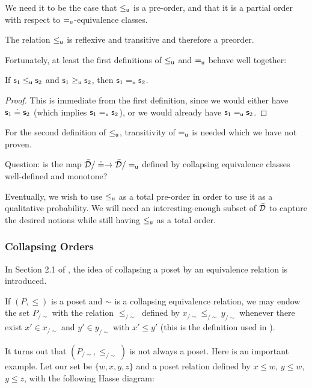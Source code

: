 \documentclass[10pt, onecolumn, longbibliography, nofootinbib]{revtex4-2}
\begin{document}
We need it to be the case that $\leq_{\mathsf{u}}$ is a pre-order, and that it is a partial order with respect to $=_{\mathsf{u}}$-equivalence classes. 

\begin{desid}
	The relation $\leq_{\mathsf{u}}$ is reflexive and transitive and therefore a preorder. 
\end{desid}

Fortunately, at least the first definitions of $\leq_{\mathsf{u}}$ and $=_{\mathsf{u}}$ behave well together:

\begin{prop}
	If $\mathsf{s}_1\leq_{\mathsf{u}}\mathsf{s}_2$ and $\mathsf{s}_1\geq_{\mathsf{u}} \mathsf{s}_2$, then $\mathsf{s}_1=_{\mathsf{u}}\mathsf{s}_2$.
\end{prop}
\begin{proof}
	This is immediate from the first definition, since we would either have $\mathsf{s}_1\doteq\mathsf{s}_2$ (which implies $\mathsf{s}_1=_{\mathsf{u}}\mathsf{s}_2$), or we would already have $\mathsf{s}_1=_{\mathsf{u}}\mathsf{s}_2$.
\end{proof}

For the second definition of $\leq_{\mathsf{u}}$, transitivity of $=_{\mathsf{u}}$ is needed which we have not proven. 

Question: is the map $\bar{\mathcal{D}} / \doteq \to \bar{\mathcal{D}} / =_{\mathsf{u}}$ defined by collapsing equivalence classes well-defined and monotone? 

Eventually, we wish to use $\leq_{\mathsf{u}}$ as a total pre-order in order to use it as a qualitative probability. We will need an interesting-enough subset of $\bar{\mathcal{D}}$ to capture the desired notions while still having $\leq_{\mathsf{u}}$ as a total order.

\subsubsection{Collapsing Orders}
In Section 2.1 of \cite{quotientposets}, the idea of collapsing a poset by an equivalence relation is introduced. 

If $(P,\leq)$ is a poset and $\sim$ is a collapsing equivalence relation, we may endow the set $P_{/\sim}$ with the relation $\leq_{/\sim}$ defined by $x_{/\sim} \leq_{/\sim} y_{/\sim}$ whenever there exist $x'\in x_{/\sim}$ and $y'\in y_{/\sim}$ with $x'\leq y'$ (this is the definition used in \cite{quotientposets}). 

It turns out that $(P_{/\sim},\leq_{/\sim})$ is not always a poset. Here is an important example. Let our set be $\{w,x,y,z\}$ and a poset relation defined by $x\leq w$, $y\leq w$, $y\leq z$, with the following Hasse diagram:
\end{document}
